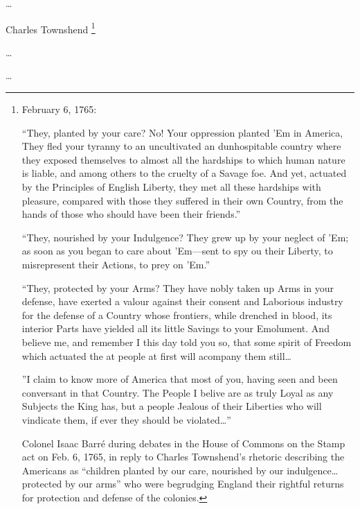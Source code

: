 \ldots

Charles Townshend
\footnote{
  February 6, 1765:

  ``They, planted by your care? No! Your oppression planted 'Em in America,
  They fled your tyranny to an uncultivated an dunhospitable country where they
  exposed themselves to almost all the hardships to which human nature is
  liable, and among others to the cruelty of a Savage foe. And yet, actuated by
  the Principles of English Liberty, they met all these hardships with pleasure,
  compared with those they suffered in their own Country, from the hands of
  those who should have been their friends.''

  ``They, nourished by your Indulgence? They grew up by your neglect of 'Em; as
  soon as you began to care about 'Em---sent to spy ou their Liberty, to
  misrepresent their Actions, to prey on 'Em.''

  ``They, protected by your Arms? They have nobly taken up Arms in your defense,
  have exerted a valour against their consent and Laborious industry for the
  defense of a Country whose frontiers, while drenched in blood, its interior
  Parts have yielded all its little Savings to your Emolument. And believe me,
  and remember I this day told you so, that some spirit of Freedom which
  actuated the at people at first will acompany them still\ldots
  
  ''I claim to know more of America that most of you, having seen and been
  conversant in that Country. The People I belive are as truly Loyal as any
  Subjects the King has, but a people Jealous of their Liberties who will
  vindicate them, if ever they should be violated\ldots''
  
  Colonel Isaac Barr\'e during debates in the House of Commons on the Stamp act
  on Feb. 6, 1765, in reply to Charles Townshend's rhetoric describing the
  Americans as ``children planted by our care, nourished by our indulgence\ldots
  protected by our arms'' who were begrudging England their rightful returns for
  protection and defense of the colonies.\cite[p. 67]{cook_long_1995}
} 

\ldots

\ldots




